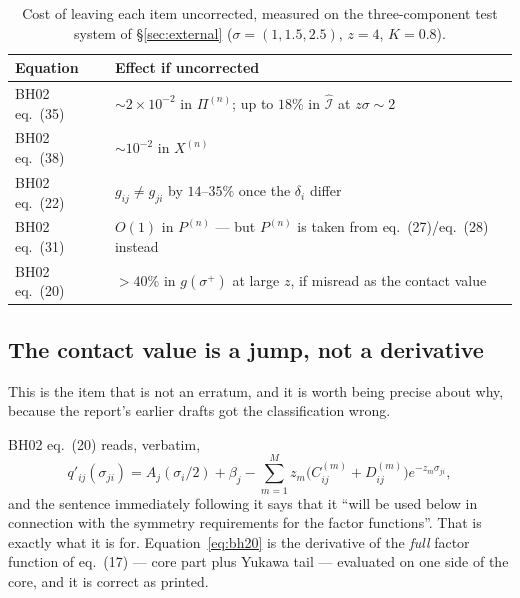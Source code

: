 \documentclass[11pt,a4paper]{article}
\newcommand{\eqBH}[1]{eq.~(#1)}
\begin{document}
\begin{table}[htbp]
\centering
\small
\caption{Cost of leaving each item uncorrected, measured on the three-component
test system of \S\ref{sec:external} ($\sigma=(1,1.5,2.5)$, $z=4$, $K=0.8$).}
\label{tab:erratacost}
\begin{tabular}{@{}ll@{}}
\toprule
Equation & Effect if uncorrected\\
\midrule
BH02 \eqBH{35} & $\sim2\times10^{-2}$ in $\Pi^{(n)}$; up to $18\%$ in
  $\hat{\mathcal I}$ at $z\sigma\sim2$\\
BH02 \eqBH{38} & $\sim10^{-2}$ in $X^{(n)}$\\
BH02 \eqBH{22} & $g_{ij}\neq g_{ji}$ by $14$--$35\%$ once the $\delta_i$ differ\\
BH02 \eqBH{31} & $O(1)$ in $P^{(n)}$ --- but $P^{(n)}$ is taken from
  \eqBH{27}/\eqBH{28} instead\\
BH02 \eqBH{20} & $>40\%$ in $g(\sigma^+)$ at large $z$, if misread as the
  contact value\\
\bottomrule
\end{tabular}
\end{table}

\subsection{The contact value is a jump, not a derivative}
\label{sec:contact}

This is the item that is not an erratum, and it is worth being precise about
why, because the report's earlier drafts got the classification wrong.

BH02 \eqBH{20} reads, verbatim,
\begin{equation}
  q'_{ij}(\sigma_{ji})=A_j(\sigma_i/2)+\beta_j
    -\sum_{m=1}^{M}z_m\bigl(C^{(m)}_{ij}+D^{(m)}_{ij}\bigr)e^{-z_m\sigma_{ji}},
  \label{eq:bh20}
\end{equation}
and the sentence immediately following it says that it ``will be used below in
connection with the symmetry requirements for the factor functions''. That is
exactly what it is for. Equation~\eqref{eq:bh20} is the derivative of the
\emph{full} factor function of \eqBH{17} --- core part plus Yukawa tail ---
evaluated on one side of the core, and it is correct as printed.
\end{document}
